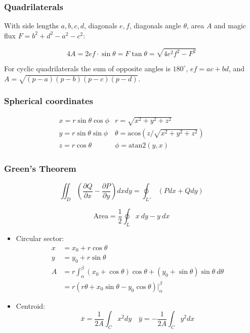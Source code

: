 \subsubsection{Quadrilaterals}
With side lengths $a,b,c,d$, diagonals $e, f$, diagonals angle $\theta$, area $A$ and
magic flux $F=b^2+d^2-a^2-c^2$:

\[ 4A = 2ef \cdot \sin\theta = F\tan\theta = \sqrt{4e^2f^2-F^2} \]

 For cyclic quadrilaterals the sum of opposite angles is $180^\circ$,
$ef = ac + bd$, and $A = \sqrt{(p-a)(p-b)(p-c)(p-d)}$.

\subsubsection{Spherical coordinates}
\[\begin{array}{cc}
x = r\sin\theta\cos\phi & r = \sqrt{x^2+y^2+z^2}\\
y = r\sin\theta\sin\phi & \theta = \textrm{acos}(z/\sqrt{x^2+y^2+z^2})\\
z = r\cos\theta & \phi = \textrm{atan2}(y,x)
\end{array}\]

\subsubsection{Green's Theorem}

\[ \iint_D \left( \frac{\partial Q}{\partial x} - \frac{\partial P}{\partial y} \right) dxdy
= \oint_{L^+} (Pdx + Qdy)\]

\[ \text{Area} = \frac{1}{2} \oint_L x\ dy - y\ dx \]

\begin{itemize}
    \item Circular sector:
        \begin{align*}
            x &= x_0 + r\cos\theta \\
            y &= y_0 + r\sin\theta \\
            A &= r \int_\alpha^\beta (x_0 + \cos\theta)\cos\theta + (y_0 + \sin\theta)\sin\theta\ d\theta \\
              &= r (r \theta + x_0 \sin\theta - y_0 \cos\theta) \rvert_\alpha^\beta
        \end{align*}
    \item Centroid:
        \[ \bar x = \frac{1}{2A} \int_C x^2 dy \quad \bar y = -\frac{1}{2A} \int_C y^2 dx \]
\end{itemize}

